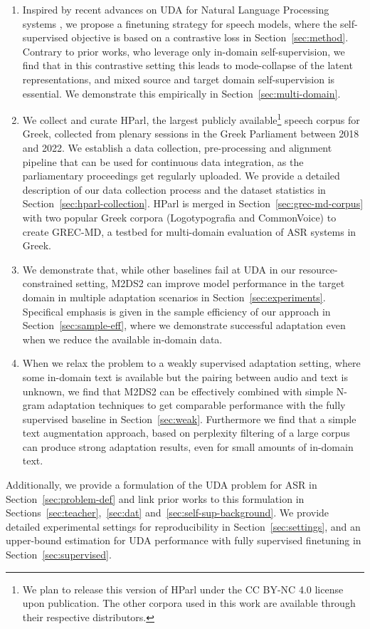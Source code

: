 \documentclass[journal]{IEEEtran}
\begin{document}
\begin{enumerate}
    \item Inspired by recent advances on UDA for Natural Language Processing systems \cite{karouzos-etal-2021-udalm}, we propose a finetuning strategy for speech models, where the self-supervised objective is based on a contrastive loss in Section~\ref{sec:method}. Contrary to prior works, who leverage only in-domain self-supervision, we find that in this contrastive setting this leads to mode-collapse of the latent representations, and mixed source and target domain self-supervision is essential. We demonstrate this empirically in Section~\ref{sec:multi-domain}.
    \item We collect and curate HParl, the largest publicly available\footnote{We plan to release this version of HParl under the CC BY-NC 4.0 license upon publication. The other corpora used in this work are available through their respective distributors.} speech corpus for Greek, collected from plenary sessions in the Greek Parliament between 2018 and 2022. We establish a data collection, pre-processing and alignment pipeline that can be used for continuous data integration, as the parliamentary proceedings get regularly uploaded. We provide a detailed description of our data collection process and the dataset statistics in Section~\ref{sec:hparl-collection}. HParl is merged in Section~\ref{sec:grec-md-corpus} with two popular Greek corpora (Logotypografia and CommonVoice) to create GREC-MD, a testbed for multi-domain evaluation of ASR systems in Greek.
    \item We demonstrate that, while other baselines fail at UDA in our resource-constrained setting, M2DS2 can improve model performance in the target domain in multiple adaptation scenarios in Section~\ref{sec:experiments}. Specifical emphasis is given in the sample efficiency of our approach in Section~\ref{sec:sample-eff}, where we demonstrate successful adaptation even when we reduce the available in-domain data.
    \item When we relax the problem to a weakly supervised adaptation setting, where some in-domain text is available but the pairing between audio and text is unknown, we find that M2DS2 can be effectively combined with simple N-gram adaptation techniques to get comparable performance with the fully supervised baseline in Section~\ref{sec:weak}. Furthermore we find that a simple text augmentation approach, based on perplexity filtering of a large corpus can produce strong adaptation results, even for small amounts of in-domain text.
\end{enumerate}
Additionally, we provide a formulation of the UDA problem for ASR in Section~\ref{sec:problem-def} and link prior works to this formulation in Sections~\ref{sec:teacher},~\ref{sec:dat} and~\ref{sec:self-sup-background}. We provide detailed experimental settings for reproducibility in Section~\ref{sec:settings}, and an upper-bound estimation for UDA performance with fully supervised finetuning in Section~\ref{sec:supervised}.
\end{document}
